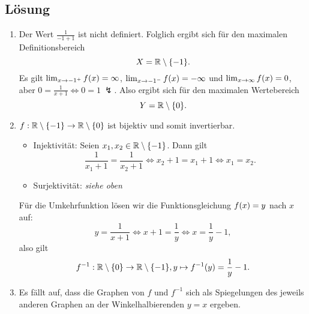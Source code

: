 \documentclass[german,12pt]{homework}
\newcommand{\RR}{\mathbb{R}}
\DeclarePairedDelimiter{\enbrace}{(}{)}
\DeclarePairedDelimiter{\penbrace}{\{}{\}}
\begin{document}
    \subsection*{Lösung}
    \begin{enumerate}
        \item Der Wert \(\frac{1}{-1 + 1}\) ist nicht definiert. Folglich ergibt sich für den maximalen Definitionsbereich
        \[X = \RR \setminus \penbrace*{-1}.\]
        Es gilt \(\lim_{x \to -1^+}f\enbrace*{x} = \infty\), \(\lim_{x \to -1^-}f\enbrace*{x} = -\infty\) und \(\lim_{x \to \infty}f\enbrace*{x} = 0\), aber \(0 = \frac{1}{x + 1} \iff 0 = 1\ \lightning\). Also ergibt sich für den maximalen Wertebereich
        \[Y = \RR \setminus \penbrace*{0}.\]
        \item \(f: \RR \setminus \penbrace*{-1} \to \RR \setminus \penbrace*{0}\) ist bijektiv und somit invertierbar.
        \begin{itemize}
            \item Injektivität: Seien \(x_1, x_2 \in \RR \setminus \penbrace*{-1}\). Dann gilt
            \[\frac{1}{x_1 + 1} = \frac{1}{x_2 + 1} \iff x_2 + 1 = x_1 + 1 \iff x_1 = x_2.\]
            \item Surjektivität: \emph{siehe oben}
        \end{itemize}
        Für die Umkehrfunktion lösen wir die Funktionsgleichung \(f\enbrace*{x} = y\) nach \(x\) auf:
        \[y = \frac{1}{x + 1} \iff x + 1 = \frac{1}{y} \iff x = \frac{1}{y} - 1,\]
        also gilt
        \[f^{-1}: \RR \setminus \penbrace*{0} \to \RR \setminus \penbrace*{-1}, y \mapsto f^{-1}\enbrace*{y} = \frac{1}{y} - 1.\]
        \item Es fällt auf, dass die Graphen von \(f\) und \(f^{-1}\) sich als Spiegelungen des jeweils anderen Graphen an der Winkelhalbierenden \(y = x\) ergeben.
        \begin{center}
\end{center}
\end{enumerate}
\end{document}
